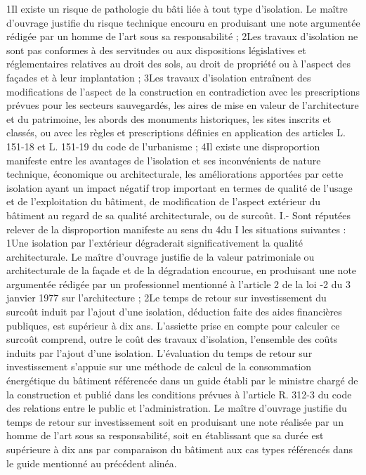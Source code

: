 		1\degres Il existe un risque de pathologie du bâti liée à tout type d'isolation. Le maître d'ouvrage justifie du risque technique encouru en produisant une note argumentée rédigée par un homme de l'art sous sa responsabilité ; 2\degres Les travaux d'isolation ne sont pas conformes à des servitudes ou aux dispositions législatives et réglementaires relatives au droit des sols, au droit de propriété ou à l'aspect des façades et à leur implantation ;
		3\degres Les travaux d'isolation entraînent des modifications de l'aspect de la construction en contradiction avec les prescriptions prévues pour les secteurs sauvegardés, les aires de mise en valeur de l'architecture et du patrimoine, les abords des monuments historiques, les sites inscrits et classés, ou avec les règles et prescriptions définies en application des articles L. 151-18 et L. 151-19 du code de l'urbanisme ;
		4\degres Il existe une disproportion manifeste entre les avantages de l'isolation et ses inconvénients de nature technique, économique ou architecturale, les améliorations apportées par cette isolation ayant un impact négatif trop important en termes de qualité de l'usage et de l'exploitation du bâtiment, de modification de l'aspect extérieur du bâtiment au regard de sa qualité architecturale, ou de surcoût.
		I.- Sont réputées relever de la disproportion manifeste au sens du 4\degres du I les situations suivantes :
		1\degres Une isolation par l'extérieur dégraderait significativement la qualité architecturale. Le maître d'ouvrage justifie de la valeur patrimoniale ou architecturale de la façade et de la dégradation encourue, en produisant une note argumentée rédigée par un professionnel mentionné à l'article 2 de la loi -2 du 3 janvier 1977 sur l'architecture ; 2\degres Le temps de retour sur investissement du surcoût induit par l'ajout d'une isolation, déduction faite des aides financières publiques, est supérieur à dix ans. L'assiette prise en compte pour calculer ce surcoût comprend, outre le coût des travaux d'isolation, l'ensemble des coûts induits par l'ajout d'une isolation. L'évaluation du temps de retour sur investissement s'appuie sur une méthode de calcul de la consommation énergétique du bâtiment référencée dans un guide établi par le ministre chargé de la construction et publié dans les conditions prévues à l'article R. 312-3 du code des relations entre le public et l'administration.
		Le maître d'ouvrage justifie du temps de retour sur investissement soit en produisant une note réalisée par un homme de l'art sous sa responsabilité, soit en établissant que sa durée est supérieure à dix ans par comparaison du bâtiment aux cas types référencés dans le guide mentionné au précédent alinéa.
